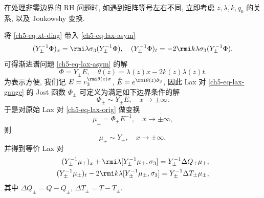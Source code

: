 \begin{remark}
    在处理非零边界的 RH 问题时, 如遇到矩阵等号左右不同, 立即考虑 $z, \lambda, k, q_{0}$ 的关系, 以及 Joukowshy 变换.
\end{remark}
将 \eqref{ch5-eq-xt-diag} 带入 \eqref{ch5-eq-lax-asym}
\begin{equation}
    (Y_{\pm}^{-1} \Phi)_{x} = \rmi \lambda \sigma_{3}(Y_{\pm}^{-1} \Phi), \quad (Y_{\pm}^{-1} \Phi)_{t} = -2 \rmi k \lambda \sigma_{3}(Y_{\pm}^{-1} \Phi).
    \label{ch5-eq-lax-diag}
\end{equation}
可得渐进谱问题 \eqref{ch5-eq-lax-asym} 的解
\begin{equation}
    \Phi = Y_{\pm} E, \quad \theta(z) = \lambda(z) x - 2 k(z) \lambda(z) t.
\end{equation}
为表示方便, 我们记 $E = e^{\rmi \theta(z) \sigma}_{3}$, $\hat{E} = e^{\rmi \theta(z) \hat{\sigma}_{3}}$, 因此 Lax 对 \eqref{ch5-eq-lax-gauge} 的 Jost 函数 $ \Phi_{\pm} $ 可定义为满足如下边界条件的解
\begin{equation}
    \Phi_{\pm} \sim Y_{\pm} E, \quad x \to \pm \infty.
\end{equation}
于是对原始 Lax 对 \eqref{ch5-eq-lax-orig} 做变换
\begin{equation}
    \mu_{\pm} = \Phi_{\pm}E^{-1}, \quad x \to \pm \infty,
    \label{ch5-eq-mu-def}
\end{equation}
则
\begin{equation}
    \mu_{\pm} \sim Y_{\pm}, \quad x \to \pm \infty,
    \label{ch5-eq-mu-asymp}
\end{equation}
并得到等价 Lax 对
\begin{align}
    (Y_{\pm}^{-1} \mu_{\pm})_{x} + \rmi \lambda [Y_{\pm}^{-1}\mu_{\pm}, \sigma_{3}] = Y_{\pm}^{-1} \Delta Q_{\pm} \mu_{\pm}, \label{ch5-eq-mu-lax-x} \\
    (Y_{\pm}^{-1} \mu_{\pm})_{t} - 2 \rmi k \lambda [Y_{\pm}^{-1}\mu_{\pm}, \sigma_{3}] = Y_{\pm}^{-1} \Delta T_{\pm} \mu_{\pm}, \label{ch5-eq-mu-lax-t}
\end{align}
其中 $ \Delta Q_{\pm} = Q - Q_{\pm} $, $ \Delta T_{\pm} = T - T_{\pm} $.
